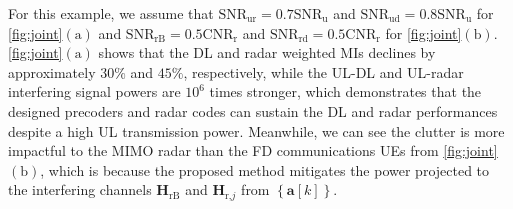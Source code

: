 \documentclass[9pt,journal]{IEEEtran}
\newcommand{\paren}[1]{\left({#1}\right)}
\newcommand{\bracket}[1]{{\left [{#1}\right ]}}
\newcommand{\braces}[1]{{\left\{ {#1}\right\}}}
\newcommand{\rr}{_\mathrm{r}}
\newcommand{\B}{\textrm{B}}
\theoremstyle{definition}
\begin{document}
For this example, we assume that $\mathrm{SNR}_{\textrm{ur}}=0.7\mathrm{SNR}_{\textrm{u}}$ and  $\mathrm{SNR}_{\textrm{ud}}=0.8\mathrm{SNR}_{\textrm{u}}$ for \figurename{\;\ref{fig:joint}$\paren{\textrm{a}}$}  and $\mathrm{SNR}_{\textrm{rB}}=0.5\mathrm{CNR}_{\textrm{r}}$ and $\mathrm{SNR}_{\textrm{rd}}=0.5\mathrm{CNR}_{\textrm{r}}$ for \figurename{\;\ref{fig:joint}$\paren{\textrm{b}}$}.  \figurename{\;\ref{fig:joint}$\paren{\textrm{a}}$} shows that the DL and radar weighted MIs declines by approximately $30\%$ and $45\%$, respectively, while the UL-DL and UL-radar interfering signal powers are $10^6$ times stronger, which demonstrates that the designed precoders and radar codes can sustain the DL and radar performances despite a high UL transmission power. Meanwhile, we can see the clutter is more impactful to the MIMO radar than the FD communications UEs from \figurename{\;\ref{fig:joint}$\paren{\textrm{b}}$}, which is because the proposed method mitigates the power projected to the interfering channels $\mathbf{H}_{\textrm{rB}}$ and $\mathbf{H}_{\textrm{r,}j}$ from $\braces{\mathbf{a}\bracket{k}}$.
\vspace{-1.2em}
\end{document}
